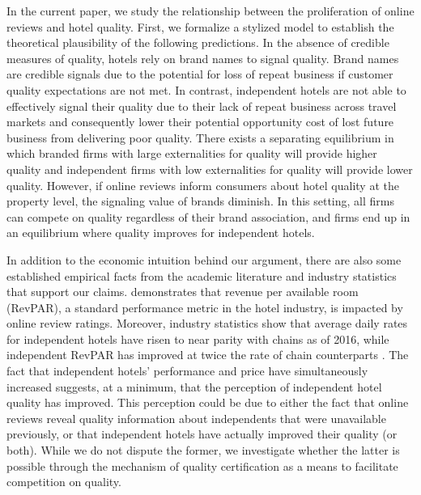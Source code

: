 \documentclass{informs_mod} %
\begin{document}
In the current paper, we study the relationship between the proliferation of online reviews and hotel quality. First, we formalize a stylized model to establish the theoretical plausibility of the following predictions. In the absence of credible measures of quality, hotels rely on brand names to signal quality. Brand names are credible signals due to the potential for loss of repeat business if customer quality expectations are not met. In contrast, independent hotels are not able to effectively signal their quality due to their lack of repeat business across travel markets and consequently lower their potential opportunity cost of lost future business from delivering poor quality. There exists a separating equilibrium in which branded firms with large externalities for quality will provide higher quality and independent firms with low externalities for quality will provide lower quality. However, if online reviews inform consumers about hotel quality at the property level, the signaling value of brands diminish. In this setting, all firms can compete on quality regardless of their brand association, and firms end up in an equilibrium where quality improves for independent hotels. 

In addition to the economic intuition behind our argument, there are also some established empirical facts from the academic literature and industry statistics that support our claims.  demonstrates that revenue per available room (RevPAR), a standard performance metric in the hotel industry, is impacted by online review ratings. Moreover, industry statistics show that average daily rates for independent hotels have risen to near parity with chains as of 2016, while independent RevPAR has improved at twice the rate of chain counterparts \citep{lodging2017}. The fact that independent hotels' performance and price have simultaneously increased suggests, at a minimum, that the perception of independent hotel quality has improved. This perception could be due to either the fact that online reviews reveal quality information about independents that were unavailable previously, or that independent hotels have actually improved their quality (or both). While we do not dispute the former, we investigate whether the latter is possible through the mechanism of quality certification as a means to facilitate competition on quality.
\end{document}
